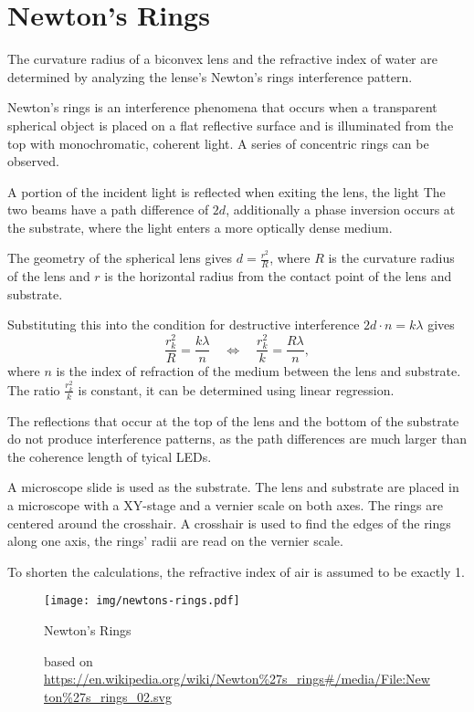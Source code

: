 \chapter{Newton's Rings}

The curvature radius of a biconvex lens and the refractive index of water are determined by analyzing the lense's Newton's rings interference pattern.


Newton's rings is an interference phenomena that occurs when a transparent spherical object is placed on a flat reflective surface and is illuminated from the top with monochromatic, coherent light.
A series of concentric rings can be observed.

A portion of the incident light is reflected when exiting the lens, the light 
The two beams have a path difference of $2 d$, additionally a phase inversion occurs at the substrate, where the light enters a more optically dense medium.

The geometry of the spherical lens gives $d = \frac{r^2}{R}$, where $R$ is the curvature radius of the lens and $r$ is the horizontal radius from the contact point of the lens and substrate.

Substituting this into the condition for destructive interference $2 d \cdot n = k \lambda$ gives
\begin{equation}\label{eq:newton}
	\frac{r_k^2}{R} = \frac{k \lambda}{n} \quad \Leftrightarrow \quad \frac{r_k^2}{k} = \frac{R \lambda}{n},
\end{equation}
where $n$ is the index of refraction of the medium between the lens and substrate.
The ratio $\frac{r_k^2}{k}$ is constant, it can be determined using linear regression.

The reflections that occur at the top of the lens and the bottom of the substrate do not produce interference patterns, as the path differences are much larger than the coherence length of tyical LEDs.

A microscope slide is used as the substrate.
The lens and substrate are placed in a microscope with a XY-stage and a vernier scale on both axes.
The rings are centered around the crosshair.
A crosshair is used to find the edges of the rings along one axis, the rings' radii are read on the vernier scale.

To shorten the calculations, the refractive index of air is assumed to be exactly \num{1}.

\begin{figure}[tbp]
	\centering
	\texttt{[image: img/newtons-rings.pdf]}
	\caption{Newton's Rings}
	\caption*{based on \url{https://en.wikipedia.org/wiki/Newton\%27s_rings\#/media/File:Newton\%27s_rings_02.svg}}
\end{figure}

